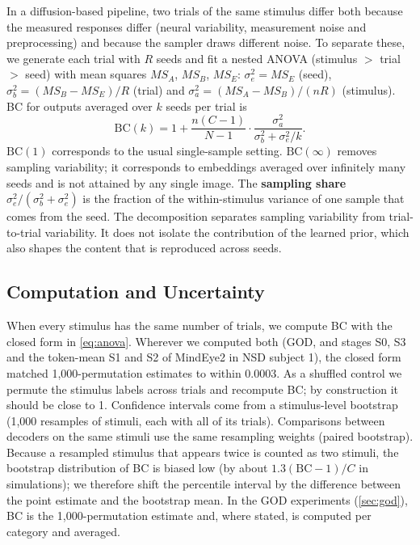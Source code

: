 \documentclass[11pt,a4paper]{article}
\begin{document}
In a diffusion-based pipeline, two trials of the same stimulus differ both
because the measured responses differ (neural variability, measurement noise and
preprocessing) and because the sampler draws different noise. To separate these, we generate each trial with $R$ seeds and fit a nested
ANOVA (stimulus $>$ trial $>$ seed) with mean squares $MS_A$, $MS_B$, $MS_E$:
$\sigma_e^2=MS_E$ (seed), $\sigma_b^2=(MS_B-MS_E)/R$ (trial) and
$\sigma_a^2=(MS_A-MS_B)/(nR)$ (stimulus). BC for outputs averaged over $k$ seeds
per trial is
\begin{equation}
  \mathrm{BC}(k)
  = 1 + \frac{n(C-1)}{N-1}\cdot\frac{\sigma_a^2}{\sigma_b^2+\sigma_e^2/k}.
  \label{eq:bck}
\end{equation}
$\mathrm{BC}(1)$ corresponds to the usual single-sample setting.
$\mathrm{BC}(\infty)$ removes sampling variability; it corresponds to embeddings
averaged over infinitely many seeds and is not attained by any single image. The
\textbf{sampling share} $\sigma_e^2/(\sigma_b^2+\sigma_e^2)$ is the fraction of
the within-stimulus variance of one sample that comes from the seed. The
decomposition separates sampling variability from trial-to-trial variability.
It does not isolate the contribution of the learned prior, which also shapes
the content that is reproduced across seeds.

\subsection{Computation and Uncertainty}
\label{sec:computation}

When every stimulus has the same number of trials, we compute BC with the closed
form in \cref{eq:anova}. Wherever we computed both (GOD, and stages S0, S3 and
the token-mean S1 and S2 of MindEye2 in NSD subject 1), the closed form matched
1,000-permutation estimates to within 0.0003. As a shuffled control we permute the stimulus labels
across trials and recompute BC; by construction it should be close to 1.
Confidence intervals come from a stimulus-level bootstrap (1,000 resamples of
stimuli, each with all of its trials). Comparisons between decoders on the same
stimuli use the same resampling weights (paired bootstrap). Because a resampled
stimulus that appears twice is counted as two stimuli, the bootstrap
distribution of BC is biased low (by about $1.3(\mathrm{BC}-1)/C$ in
simulations); we therefore shift the percentile interval by the difference
between the point estimate and the bootstrap mean. In the GOD experiments
(\cref{sec:god}), BC is the 1,000-permutation estimate and, where stated, is
computed per category and averaged.
\end{document}
